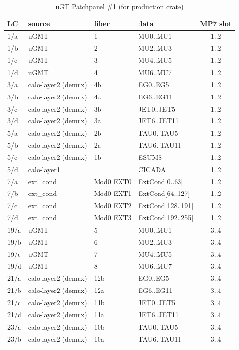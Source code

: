 \begin{longtable}{|l|l|l|l|c|}
\caption{uGT Patchpanel \#1 (for production crate)}
    \label{tab:app:opt_pp_tab_1}\\
\hline
\textbf{LC} & \textbf{source} & \textbf{fiber} & \textbf{data} & \textbf{MP7 slot}\\
\hline
\hline
\endhead
1/a & uGMT & 1 & MU0..MU1 & 1..2\\
1/b & uGMT & 2 & MU2..MU3 & 1..2\\
1/c & uGMT & 3 & MU4..MU5 & 1..2\\
1/d & uGMT & 4 & MU6..MU7 & 1..2\\
3/a & calo-layer2 (demux) & 4b & EG0..EG5 & 1..2\\
3/b & calo-layer2 (demux) & 4a & EG6..EG11 & 1..2\\
3/c & calo-layer2 (demux) & 3b & JET0..JET5 & 1..2\\
3/d & calo-layer2 (demux) & 3a & JET6..JET11 & 1..2\\
5/a & calo-layer2 (demux) & 2b & TAU0..TAU5 & 1..2\\
5/b & calo-layer2 (demux) & 2a & TAU6..TAU11 & 1..2\\
5/c & calo-layer2 (demux) & 1b & ESUMS & 1..2\\
5/d & calo-layer1 &  & CICADA & 1..2\\
7/a & ext\_cond & Mod0 EXT0 & ExtCond[0..63] & 1..2 \\
7/b & ext\_cond & Mod0 EXT1 & ExtCond[64..127] & 1..2\\
7/c & ext\_cond & Mod0 EXT2 & ExtCond[128..191] & 1..2\\
7/d & ext\_cond & Mod0 EXT3 & ExtCond[192..255] & 1..2\\\hline
19/a & uGMT & 5 & MU0..MU1 & 3..4\\
19/b & uGMT & 6 & MU2..MU3 & 3..4\\
19/c & uGMT & 7 & MU4..MU5 & 3..4\\
19/d & uGMT & 8 & MU6..MU7 & 3..4\\
21/a & calo-layer2 (demux) & 12b & EG0..EG5 & 3..4\\       
21/b & calo-layer2 (demux) & 12a & EG6..EG11 & 3..4\\      
21/c & calo-layer2 (demux) & 11b & JET0..JET5 & 3..4\\     
21/d & calo-layer2 (demux) & 11a & JET6..JET11 & 3..4\\    
23/a & calo-layer2 (demux) & 10b & TAU0..TAU5 & 3..4\\     
23/b & calo-layer2 (demux) & 10a & TAU6..TAU11 & 3..4\\    

\end{longtable}
